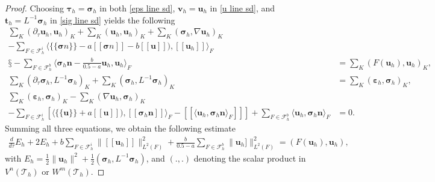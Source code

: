 \documentclass[11pt]{article}
\newcommand{\bu}{\mathbf{u}}
\newcommand{\bt}{\mathbf{t}}
\newcommand{\sig}{\boldsymbol{\sigma}}
\newcommand{\beps}{\boldsymbol{\varepsilon}}
\newcommand{\ljp}{ [\![ }
\newcommand{\rjp}{ ]\!] }
\begin{document}
\begin{proof}
Choosing $\boldsymbol{\tau}_h = \boldsymbol{\sigma}_h$ in both \eqref{eps line sd}, $\mathbf{v}_h = \bu_h$ in \eqref{u line sd}, and $\bt_h = L^{-1} \boldsymbol{\sigma}_h$ in \eqref{sig line sd} yields the following
\begingroup
\begin{align}
 \sum_{K} ( \partial_\tau \mathbf{u}_h, \mathbf{u}_h)_K+ \sum_{K} (\mathbf{u}_h, \mathbf{u}_h)_K
+ \sum_{K} (\boldsymbol{\sigma}_h, \nabla \mathbf{u}_h)_K\qquad\qquad\nonumber \\ -\sum_{F \in \mathcal{F}_h^i} \langle \{\!\{\sig n\}\!\} - a \ljp \sig n \rjp
- b [\![\bu]\!]), \ljp \mathbf{u}_h  \rjp\rangle_{F}\qquad \nonumber \\§
-\sum_{F \in \mathcal{F}_h^b} \langle \boldsymbol{\sigma}_h \mathbf{n}- \frac{b}{0.5-a} \bu_h , \mathbf{u}_h \rangle_{F}
&= \sum_{K} (F(\bu_h), \mathbf{u}_h)_K,
\label{u line}\\
%
\sum_K (\partial_\tau \boldsymbol{\sigma}_h, L^{-1} \sig_h)_K
+\sum_K (\boldsymbol{\sigma}_h, L^{-1}\boldsymbol{\sigma}_h)_K
&= \sum_K (\beps_h, \sig_h)_K, \label{sig line}\\
\sum_{K} (\beps_h, \sig_h)_K - \sum_{K} (\nabla \mathbf{u}_h, \sig_h)_K \qquad \nonumber\\
 - \sum_{F \in \mathcal{F}_h^i}  \left[ \langle \{\!\{\bu \}\!\} + a \ljp \bu\rjp), \ljp \sig_h \mathbf{n} \rjp \rangle_F - \ljp \langle \mathbf{u}_h, \sig_h \mathbf{n} \rangle_F \rjp \right] + \sum_{F \in \mathcal{F}_h^b}   \langle \mathbf{u}_h, \sig_h \mathbf{n} \rangle_F& =0. \label{eps line}
\end{align}
\endgroup
Summing all three equations, we obtain the following estimate
\begin{equation}
\label{eq:final-energy}
\begin{aligned}
\frac{d}{d\tau}E_h + 2 E_h + b \sum_{F \in \mathcal{F}_h^i}
\|[\![\mathbf{u}_h]\!]\|^2_{L^2(F)}
+ \frac{b}{0.5-a} \sum_{F \in \mathcal{F}_h^b}
\|\mathbf{u}_h]\|^2_{L^2(F)}
=  ( F(\bu_h), \bu_h),
\end{aligned}
\end{equation} with $E_h = \frac{1}{2}\|\bu_h\|^2 + \frac{1}{2}(\sig_h, L^{-1} \sig_h)$, and $(., .)$ denoting the scalar product in $V^n(\mathcal{T}_h)$ or $W^m(\mathcal{T}_h)$. 


\end{proof}
\end{document}
